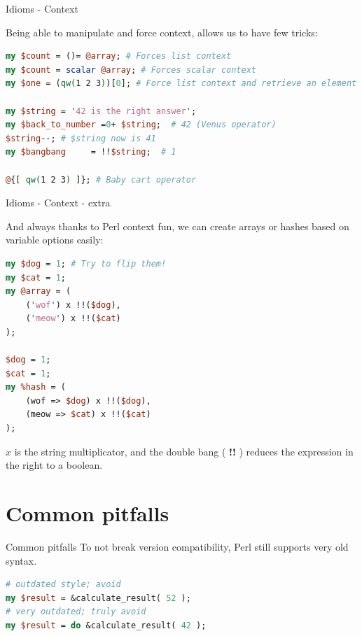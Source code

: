 \documentclass[10pt]{beamer}
\begin{document}
\begin{frame}[fragile]{Idioms - Context}

Being able to manipulate and force context, allows us to have few tricks:
\begin{lstlisting}[language=perl]
my $count = ()= @array; # Forces list context
my $count = scalar @array; # Forces scalar context
my $one = (qw(1 2 3))[0]; # Force list context and retrieve an element in array

my $string = '42 is the right answer';
my $back_to_number =0+ $string;  # 42 (Venus operator)
$string--; # $string now is 41
my $bangbang     = !!$string;  # 1

@{[ qw(1 2 3) ]}; # Baby cart operator
\end{lstlisting}

\end{frame}

\begin{frame}[fragile]{Idioms - Context - extra }

And always thanks to Perl context fun, we can create arrays or hashes based on variable options easily:

\begin{lstlisting}[language=perl]
my $dog = 1; # Try to flip them!
my $cat = 1;
my @array = (
    ('wof') x !!($dog),
    ('meow') x !!($cat)
);

$dog = 1;
$cat = 1;
my %hash = (
    (wof => $dog) x !!($dog),
    (meow => $cat) x !!($cat)
);

\end{lstlisting}

$x$ is the string multiplicator, and the double bang ( \textbf{!!} ) reduces the expression in the right to a boolean.

\end{frame}


\section{Common pitfalls}
\begin{frame}[fragile]{Common pitfalls}
To not break version compatibility, Perl still supports very old syntax.

\begin{lstlisting}[language=perl]
# outdated style; avoid
my $result = &calculate_result( 52 );
# very outdated; truly avoid
my $result = do &calculate_result( 42 );
\end{lstlisting}\cite{2016modern}


\end{frame}
\end{document}
